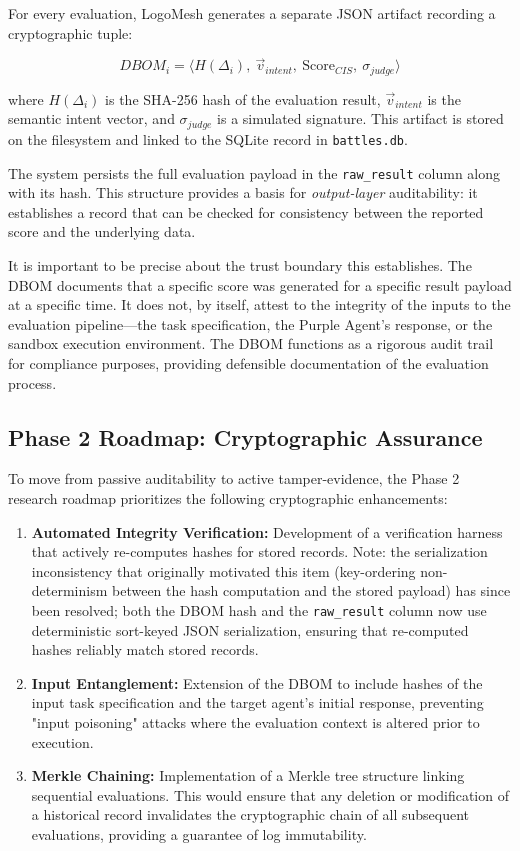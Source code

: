 \documentclass[11pt, a4paper]{article}
\begin{document}
For every evaluation, LogoMesh generates a separate JSON artifact recording a cryptographic tuple:

\[
DBOM_i = \langle H(\Delta_i),\ \vec{v}_{intent},\ \text{Score}_{CIS},\ \sigma_{judge} \rangle
\]

where $H(\Delta_i)$ is the SHA-256 hash of the evaluation result, $\vec{v}_{intent}$ is the semantic intent vector, and $\sigma_{judge}$ is a simulated signature. This artifact is stored on the filesystem and linked to the SQLite record in \texttt{battles.db}.

The system persists the full evaluation payload in the \texttt{raw\_result} column along with its hash. This structure provides a basis for \emph{output-layer} auditability: it establishes a record that can be checked for consistency between the reported score and the underlying data.

It is important to be precise about the trust boundary this establishes. The DBOM documents that a specific score was generated for a specific result payload at a specific time. It does not, by itself, attest to the integrity of the inputs to the evaluation pipeline—the task specification, the Purple Agent's response, or the sandbox execution environment. The DBOM functions as a rigorous audit trail for compliance purposes, providing defensible documentation of the evaluation process.

\subsection{Phase 2 Roadmap: Cryptographic Assurance}

To move from passive auditability to active tamper-evidence, the Phase 2 research roadmap prioritizes the following cryptographic enhancements:

\begin{enumerate}[leftmargin=*]
  \item \textbf{Automated Integrity Verification:} Development of a verification harness that actively re-computes hashes for stored records. Note: the serialization inconsistency that originally motivated this item (key-ordering non-determinism between the hash computation and the stored payload) has since been resolved; both the DBOM hash and the \texttt{raw\_result} column now use deterministic sort-keyed JSON serialization, ensuring that re-computed hashes reliably match stored records.
  \item \textbf{Input Entanglement:} Extension of the DBOM to include hashes of the input task specification and the target agent's initial response, preventing "input poisoning" attacks where the evaluation context is altered prior to execution.
  \item \textbf{Merkle Chaining:} Implementation of a Merkle tree structure linking sequential evaluations. This would ensure that any deletion or modification of a historical record invalidates the cryptographic chain of all subsequent evaluations, providing a guarantee of log immutability.
\end{enumerate}
\end{document}
